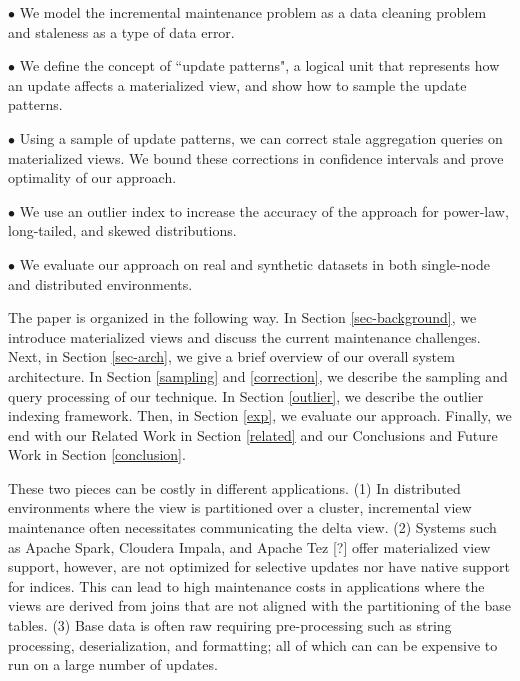 \noindent $\bullet$ We model the incremental maintenance problem as a data cleaning problem and staleness as a type of data error.\vspace{0.25em}

\noindent $\bullet$ We define the concept of ``update patterns", a logical unit that represents how an update affects a materialized view, and show how to sample the update patterns. \vspace{0.25em}

\noindent $\bullet$ Using a sample of update patterns, we can correct stale aggregation queries on materialized views. We bound these corrections in confidence intervals and prove optimality of our approach. \vspace{0.25em}

\noindent $\bullet$ We use an outlier index to increase the accuracy of the approach for power-law, long-tailed, and skewed distributions.\vspace{0.25em}

\noindent $\bullet$ We evaluate our approach on real and synthetic datasets in both single-node and distributed environments.\vspace{0.25em}

The paper is organized in the following way. 
In Section \ref{sec-background}, we introduce materialized views and discuss the current maintenance challenges.
Next, in Section \ref{sec-arch}, we give a brief overview of our overall system architecture.
In Section \ref{sampling} and \ref{correction}, we describe the sampling and query processing of our technique.
In Section \ref{outlier}, we describe the outlier indexing framework.
Then, in Section \ref{exp}, we evaluate our approach.
Finally, we end with our Related Work in Section \ref{related} and our Conclusions and Future Work in Section \ref{conclusion}.

\iffalse
 These two pieces can be costly in different
applications. (1) In distributed environments where the view is partitioned
over a cluster, incremental view maintenance often necessitates communicating
the delta view. (2) Systems such as Apache Spark, Cloudera Impala,
and Apache Tez {[}?{]} offer materialized view support, however, are
not optimized for selective updates nor have native support for indices.
This can lead to high maintenance costs in applications where the
views are derived from joins that are not aligned with the partitioning
of the base tables. (3) Base data is often raw requiring pre-processing
such as string processing, deserialization, and formatting; all of
which can can be expensive to run on a large number of updates. 



